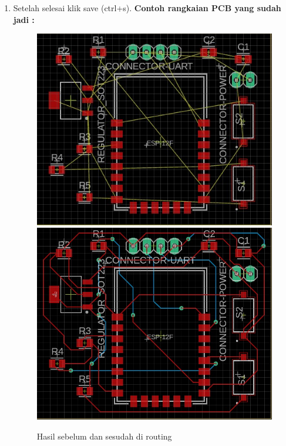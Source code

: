 \begin{enumerate}
    \item Setelah selesai klik save (ctrl+s).
    \textbf{Contoh rangkaian PCB yang sudah jadi :}
        \begin{figure}[H]
            \centering
            \includegraphics[width=0.47\linewidth]{P1/img/sebelum_di_routing.jpg}
            \includegraphics[width=0.47\linewidth]{P1/img/setelah_dirouting.jpg}
            \caption{Hasil sebelum dan sesudah di routing}
        \end{figure}
\end{enumerate}
